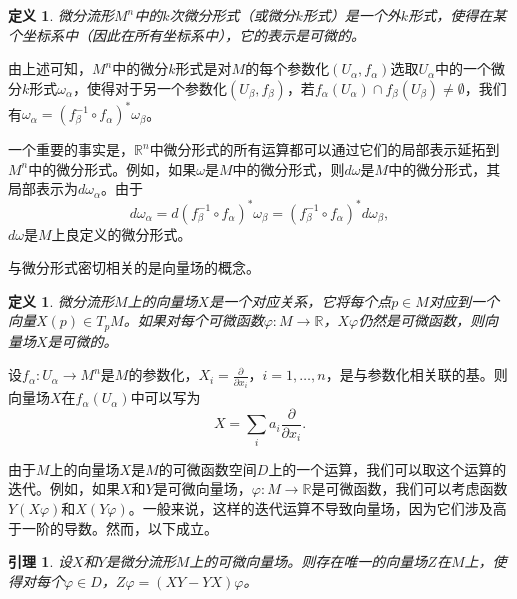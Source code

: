 \documentclass[12pt,a4paper]{ctexbook}
\newtheorem{lemma}[theorem]{引理}
\newtheorem{definition}[theorem]{定义}
\begin{document}
\begin{definition}
微分流形$M^n$中的$k$次微分形式（或微分$k$形式）是一个外$k$形式，使得在某个坐标系中（因此在所有坐标系中），它的表示是可微的。
\end{definition}

由上述可知，$M^n$中的微分$k$形式是对$M$的每个参数化$(U_\alpha,f_\alpha)$选取$U_\alpha$中的一个微分$k$形式$\omega_\alpha$，使得对于另一个参数化$(U_\beta,f_\beta)$，若$f_\alpha(U_\alpha)\cap f_\beta(U_\beta)\neq\emptyset$，我们有$\omega_\alpha = (f_\beta^{-1}\circ f_\alpha)^*\omega_\beta$。

一个重要的事实是，$\mathbb{R}^n$中微分形式的所有运算都可以通过它们的局部表示延拓到$M^n$中的微分形式。例如，如果$\omega$是$M$中的微分形式，则$d\omega$是$M$中的微分形式，其局部表示为$d\omega_\alpha$。由于
$$d\omega_\alpha = d(f_\beta^{-1}\circ f_\alpha)^*\omega_\beta = (f_\beta^{-1}\circ f_\alpha)^*d\omega_\beta,$$
$d\omega$是$M$上良定义的微分形式。

与微分形式密切相关的是向量场的概念。

\begin{definition}
微分流形$M$上的向量场$X$是一个对应关系，它将每个点$p\in M$对应到一个向量$X(p)\in T_pM$。如果对每个可微函数$\varphi:M\to\mathbb{R}$，$X\varphi$仍然是可微函数，则向量场$X$是可微的。
\end{definition}

设$f_\alpha:U_\alpha\to M^n$是$M$的参数化，$X_i = \frac{\partial}{\partial x_i}$，$i=1,\ldots,n$，是与参数化相关联的基。则向量场$X$在$f_\alpha(U_\alpha)$中可以写为
$$X = \sum_i a_i \frac{\partial}{\partial x_i}.$$

由于$M$上的向量场$X$是$M$的可微函数空间$D$上的一个运算，我们可以取这个运算的迭代。例如，如果$X$和$Y$是可微向量场，$\varphi:M\to\mathbb{R}$是可微函数，我们可以考虑函数$Y(X\varphi)$和$X(Y\varphi)$。一般来说，这样的迭代运算不导致向量场，因为它们涉及高于一阶的导数。然而，以下成立。

\begin{lemma}
设$X$和$Y$是微分流形$M$上的可微向量场。则存在唯一的向量场$Z$在$M$上，使得对每个$\varphi\in D$，$Z\varphi = (XY-YX)\varphi$。
\end{lemma}
\end{document}
